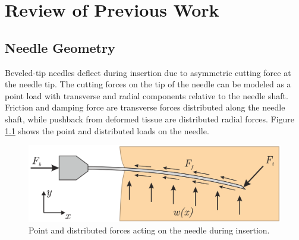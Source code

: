 %
%
%



\chapter{Review of Previous Work}
\label{sec:lit_review} %


\section{Needle Geometry}
Beveled-tip needles deflect during insertion due to asymmetric cutting force at the needle tip. The cutting forces on the tip of the needle can be modeled as a point load with transverse  and radial components relative to the needle shaft. Friction and damping force are transverse forces distributed along the needle shaft, while pushback from deformed tissue are distributed radial forces. Figure \ref{fig:needle_forces} shows the point and distributed loads on the needle.

\begin{figure}[h]
\includegraphics[width=1.0\textwidth]{Fig/chap2/roesthius_needle_forces.png}
\caption{Point and distributed forces acting on the needle during insertion\cite{roesthuis_mechanics-based_2012}.}
\label{fig:needle_forces}
\end{figure}

